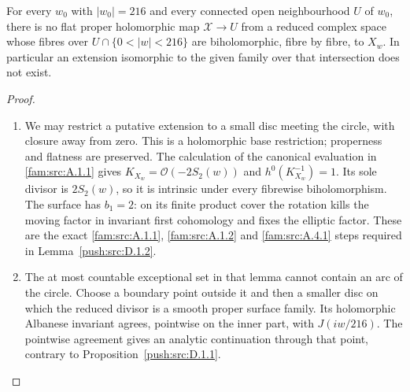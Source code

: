 \begin{theorem}\hypertarget{tag-032C}{}\label{push:src:D.1.3}

For every \(w_0\) with \(|w_0|=216\) and every connected open
neighbourhood \(U\) of \(w_0\), there is no flat proper holomorphic
map \(\mathcal X\to U\) from a reduced complex space whose fibres
over \(U\cap\{0<|w|<216\}\) are biholomorphic, fibre by fibre, to
\(X_w\). In particular an extension isomorphic to the given family
over that intersection does not exist.
\end{theorem}


\begin{proof}
\begin{enumerate}[label=\arabic*.,leftmargin=*]
\item We may restrict a putative extension to a small disc meeting the
circle, with closure away from zero. This is a holomorphic base
restriction; properness and flatness are preserved. The calculation
of the canonical evaluation in \cref{fam:src:A.1.1} gives
\(K_{X_w}=\mathcal O(-2S_2(w))\) and
\(h^0(K_{X_w}^{-1})=1\). Its sole divisor is \(2S_2(w)\), so it is
intrinsic under every fibrewise biholomorphism. The surface has
\(b_1=2\): on its finite product cover the rotation kills the moving
factor in invariant first cohomology and fixes the elliptic factor.
These are the exact \cref{fam:src:A.1.1}, \cref{fam:src:A.1.2} and \cref{fam:src:A.4.1} steps required in Lemma~\ref{push:src:D.1.2}.

\item The at most countable exceptional set in that lemma cannot contain
an arc of the circle. Choose a boundary point outside it and then a smaller disc
on which the reduced divisor is a smooth proper surface family. Its
holomorphic Albanese invariant agrees, pointwise on the inner part,
with \(J(iw/216)\). The pointwise agreement gives an analytic continuation through
that point, contrary to Proposition~\ref{push:src:D.1.1}.
\end{enumerate}
\end{proof}